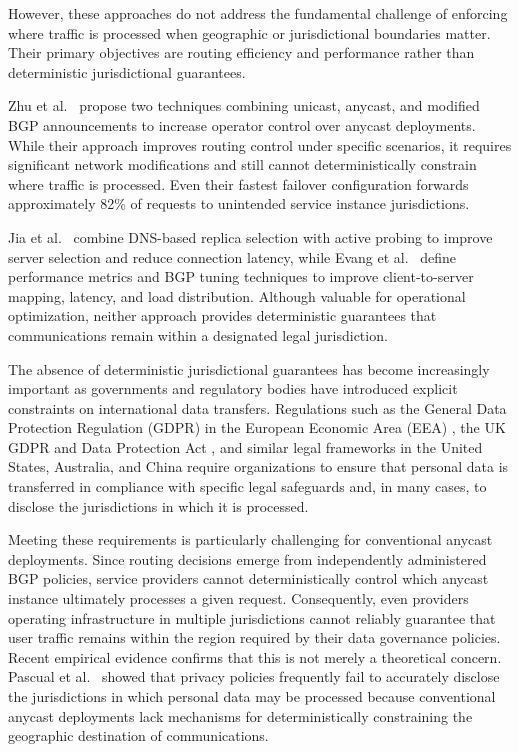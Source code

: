\documentclass[acmsmall]{acmart}
\begin{document}
However, these approaches do not address the fundamental challenge of enforcing where traffic is processed when geographic or jurisdictional boundaries matter. Their primary objectives are routing efficiency and performance rather than deterministic jurisdictional guarantees.

Zhu et al.~\cite{Zhu2022TheWorlds} propose two techniques combining unicast, anycast, and modified BGP announcements to increase operator control over anycast deployments. While their approach improves routing control under specific scenarios, it requires significant network modifications and still cannot deterministically constrain where traffic is processed. Even their fastest failover configuration forwards approximately 82\% of requests to unintended service instance jurisdictions.

Jia et al.~\cite{Jia2019DeployingInternet} combine DNS-based replica selection with active probing to improve server selection and reduce connection latency, while Evang et al.~\cite{Evang2024AnycastTuning} define performance metrics and BGP tuning techniques to improve client-to-server mapping, latency, and load distribution. Although valuable for operational optimization, neither approach provides deterministic guarantees that communications remain within a designated legal jurisdiction.

The absence of deterministic jurisdictional guarantees has become increasingly important as governments and regulatory bodies have introduced explicit constraints on international data transfers. Regulations such as the General Data Protection Regulation (GDPR) in the European Economic Area (EEA) \cite{REGULATIONSRelevance}, the UK GDPR and Data Protection Act \cite{Data2018}, and similar legal frameworks in the United States, Australia, and China \cite{Rep.Pallone2024Text2024, ReadOAIC, TheTranslation} require organizations to ensure that personal data is transferred in compliance with specific legal safeguards and, in many cases, to disclose the jurisdictions in which it is processed.

Meeting these requirements is particularly challenging for conventional anycast deployments. Since routing decisions emerge from independently administered BGP policies, service providers cannot deterministically control which anycast instance ultimately processes a given request. Consequently, even providers operating infrastructure in multiple jurisdictions cannot reliably guarantee that user traffic remains within the region required by their data governance policies. Recent empirical evidence confirms that this is not merely a theoretical concern. Pascual et al.~\cite{Pascual2025AnycastDisaster} showed that privacy policies frequently fail to accurately disclose the jurisdictions in which personal data may be processed because conventional anycast deployments lack mechanisms for deterministically constraining the geographic destination of communications.
\end{document}
